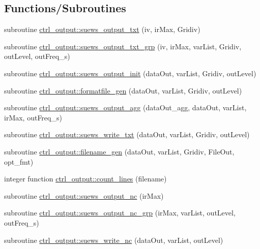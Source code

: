 \subsection*{Functions/\+Subroutines}
\begin{DoxyCompactItemize}
\item 
subroutine \hyperlink{namespacectrl__output_a33e3b788edad27be3211458c4388f8e5}{ctrl\+\_\+output\+::suews\+\_\+output\+\_\+txt} (iv, ir\+Max, Gridiv)
\item 
subroutine \hyperlink{namespacectrl__output_ac3541cbdb88f9028bc3592ee65b64980}{ctrl\+\_\+output\+::suews\+\_\+output\+\_\+txt\+\_\+grp} (iv, ir\+Max, var\+List, Gridiv, out\+Level, out\+Freq\+\_\+s)
\item 
subroutine \hyperlink{namespacectrl__output_aa089b1e6d88c1556fb0d0f645face272}{ctrl\+\_\+output\+::suews\+\_\+output\+\_\+init} (data\+Out, var\+List, Gridiv, out\+Level)
\item 
subroutine \hyperlink{namespacectrl__output_a754f1fcb7692b22f531bcbd7fffd2634}{ctrl\+\_\+output\+::formatfile\+\_\+gen} (data\+Out, var\+List, Gridiv, out\+Level)
\item 
subroutine \hyperlink{namespacectrl__output_ae9a62c39f1b7598a639718dd95127977}{ctrl\+\_\+output\+::suews\+\_\+output\+\_\+agg} (data\+Out\+\_\+agg, data\+Out, var\+List, ir\+Max, out\+Freq\+\_\+s)
\item 
subroutine \hyperlink{namespacectrl__output_a84e30d3564e406535ea078c470a62668}{ctrl\+\_\+output\+::suews\+\_\+write\+\_\+txt} (data\+Out, var\+List, Gridiv, out\+Level)
\item 
subroutine \hyperlink{namespacectrl__output_a01d8b0b36afd96d4fe5ff45436e13782}{ctrl\+\_\+output\+::filename\+\_\+gen} (data\+Out, var\+List, Gridiv, File\+Out, opt\+\_\+fmt)
\item 
integer function \hyperlink{namespacectrl__output_ad7bc76aa43873e663835c8d008f7d548}{ctrl\+\_\+output\+::count\+\_\+lines} (filename)
\item 
subroutine \hyperlink{namespacectrl__output_abe2b9152111665466982f35349bf24d8}{ctrl\+\_\+output\+::suews\+\_\+output\+\_\+nc} (ir\+Max)
\item 
subroutine \hyperlink{namespacectrl__output_a333bec5a308bd89762292b7f695bdb9b}{ctrl\+\_\+output\+::suews\+\_\+output\+\_\+nc\+\_\+grp} (ir\+Max, var\+List, out\+Level, out\+Freq\+\_\+s)
\item 
subroutine \hyperlink{namespacectrl__output_a34f8d939c96cb60cdf1f9739e1ea4672}{ctrl\+\_\+output\+::suews\+\_\+write\+\_\+nc} (data\+Out, var\+List, out\+Level)

\end{DoxyCompactItemize}
